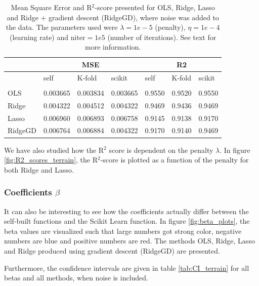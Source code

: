 \begin{table} [H]
	\caption{Mean Square Error and R$^2$-score presented for OLS, Ridge, Lasso and Ridge + gradient descent (RidgeGD), where noise was added to the data. The parameters used were $\lambda=1e-5$ (penalty), $\eta=1e-4$ (learning rate) and $\text{niter}=1e5$ (number of iterations). See text for more information.}
	\begin{tabularx}{\textwidth}{l|XXX|XXX} \hline\hline
		\label{tab:terrain_error}
		& \multicolumn{3}{c}{\textbf{MSE}}&\multicolumn{3}{c}{\textbf{R2}}\\ \hline
		&self&K-fold&scikit&self&K-fold&scikit\\ \hline \\
		OLS & 0.003665 & 0.003834 & 0.003665 & 0.9550 & 0.9520 & 0.9550\\
		Ridge & 0.004322 & 0.004512 & 0.004322 & 0.9469 & 0.9436 & 0.9469 \\
		Lasso & 0.006960 & 0.006893 & 0.006758 & 0.9145 & 0.9138 & 0.9170 \\
		RidgeGD & 0.006764 & 0.006884 & 0.004322 & 0.9170 & 0.9140 & 0.9469 \\ \hline
	\end{tabularx}
\end{table}

We have also studied how the R$^2$ score is dependent on the penalty $\lambda$. In figure \eqref{fig:R2_scores_terrain}, the R$^2$-score is plotted as a function of the penalty for both Ridge and Lasso.


\iffalse
\subsubsection{Coefficients $\beta$}
It can also be interesting to see how the coefficients actually differ between the self-built functions and the Scikit Learn function. In figure \eqref{fig:beta_plots}, the beta values are visualized such that large numbers got strong color, negative numbers are blue and positive numbers are red. The methods OLS, Ridge, Lasso and Ridge produced using gradient descent (RidgeGD) are presented. 

Furthermore, the confidence intervals are given in table \eqref{tab:CI_terrain} for all betas and all methods, when noise is included.


